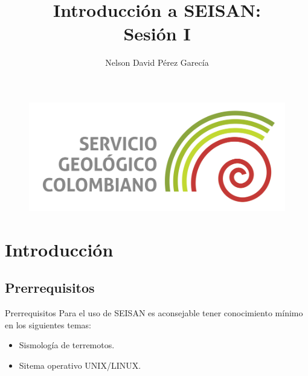 \documentclass[11pt]{beamer}
\author{Nelson David Pérez Garecía\\}
\title{Introducción a SEISAN:\\Sesión I}
\institute{Red Sismológica Nacional, \\Servicio Geológico Colombiano}
\date{}
\begin{document}
\begin{frame}
\titlepage
\begin{center}
\begin{figure}
\includegraphics[scale=0.15]{Logo-SGC.jpg}
\end{figure}
\end{center}
\end{frame}

\begin{frame}
\tableofcontents
\end{frame}

\section{Introducción}
\subsection{Prerrequisitos}
\begin{frame}{Prerrequisitos}
Para el uso de SEISAN es aconsejable tener conocimiento mínimo en los siguientes temas:
\begin{itemize}
\item Sismología de terremotos.
\pause
\item Sitema operativo UNIX/LINUX. 
\end{itemize}
\end{frame}
\end{document}
